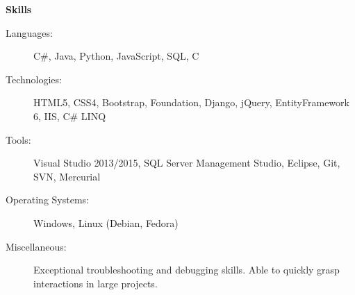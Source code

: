\documentclass[letterpaper,11pt]{article}
\newcommand{\resheading}[1]{{\large \colorbox{mygrey}{\begin{minipage}{\textwidth}{\textbf{#1 \vphantom{p\^{E}}}}\end{minipage}}}}
\begin{document}
\resheading{Skills}
\begin{description}
\item[Languages:]
C\#, Java, Python, JavaScript, SQL, C
\item[Technologies:]
HTML5, CSS4, Bootstrap, Foundation, Django, jQuery, EntityFramework 6, IIS, C\# LINQ
\item[Tools:]
Visual Studio 2013/2015, SQL Server Management Studio, Eclipse, Git, SVN, Mercurial
\item[Operating Systems:]
Windows, Linux (Debian, Fedora)
\item[Miscellaneous:]
Exceptional troubleshooting and debugging skills. Able to quickly grasp interactions in large projects.
\end{description}
\end{document}
